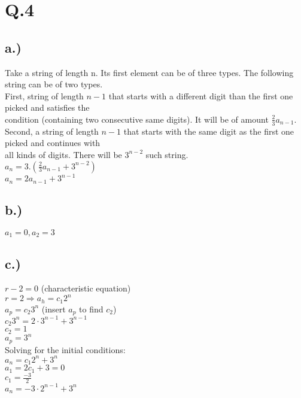 \documentclass[11pt]{article}
\begin{document}
\pagebreak

\section*{Q.4}

\subsection*{a.)}

	Take a string of length n. Its first element can be of three types. The following string can be of two types. \\
	First, string of length $ n - 1 $ that starts with a different digit than the first one picked and satisfies the \\
	condition (containing two consecutive same digits). It will be of amount $\frac{2}{3} a_{n-1} $. \\
	Second, a string of length $ n - 1 $ that starts with the same digit as the first one picked and continues with \\
	all kinds of digits. There will be $ 3^{n-2} $ such string. \\
			$ a_n  = 3 . ( \frac{2}{3} a_{n-1} + 3^{n-2}) $ \\
			$ a_n  = 2 a_{n-1} + 3^{n-1} $ \\
\subsection*{b.)}

	$ a_1 = 0 , a_2 = 3 $ \\

\subsection*{c.)}

	$ r - 2 = 0 $ (characteristic equation) \\
	$ r = 2  \Rightarrow  a_h = c_1 2^n$ \\
	$ a_p = c_2 3^n $ (insert $a_p$ to find $c_2$) \\
	$ c_2 3^n = 2 \cdot 3^{n-1} + 3^{n-1} $ \\
	$ c_2 = 1 $ \\
	$ a_p = 3^n $ \\
	Solving for the initial conditions: \\
	$ a_n = c_1 2^n + 3^n $ \\
	$ a_1 = 2 c_1 + 3 = 0$ \\
	$ c_1 = \frac{-3}{2} $ \\
	$ a_n = -3 \cdot 2^{n-1} + 3^{n} $ \\



\end{document}
